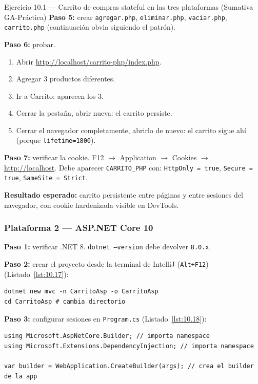 \begin{cajaejercicio}{Ejercicio 10.1 --- Carrito de compras stateful en las tres plataformas (Sumativa GA-Práctica)}
\textbf{Paso 5:} crear \texttt{agregar.php}, \texttt{eliminar.php},
\texttt{vaciar.php}, \texttt{carrito.php} (continuación obvia siguiendo
el patrón).

\textbf{Paso 6:} probar.
\begin{enumerate}
\item Abrir \url{http://localhost/carrito-php/index.php}.
\item Agregar 3 productos diferentes.
\item Ir a Carrito: aparecen los 3.
\item Cerrar la pestaña, abrir nueva: el carrito persiste.
\item Cerrar el navegador completamente, abrirlo de nuevo: el carrito
sigue ahí (porque \texttt{lifetime=1800}).
\end{enumerate}

\textbf{Paso 7:} verificar la cookie. F12 $\rightarrow$ Application
$\rightarrow$ Cookies $\rightarrow$ \url{http://localhost}. Debe
aparecer \texttt{CARRITO\_PHP} con: \texttt{HttpOnly = true},
\texttt{Secure = true}, \texttt{SameSite = Strict}.

\textbf{Resultado esperado:} carrito persistente entre páginas y entre
sesiones del navegador, con cookie hardenizada visible en DevTools.

\subsubsection*{Plataforma 2 --- ASP.NET Core 10}

\textbf{Paso 1:} verificar .NET 8. \texttt{dotnet --version} debe
devolver \texttt{8.0.x}.

\textbf{Paso 2:} crear el proyecto desde la terminal de IntelliJ
(\texttt{Alt+F12}) (Listado~\ref{lst:10.17}):
\begin{lstlisting}[style=shell,numbers=none,caption={Ejemplo de Shell},label=lst:10.17]
dotnet new mvc -n CarritoAsp -o CarritoAsp
cd CarritoAsp # cambia directorio
\end{lstlisting}

\textbf{Paso 3:} configurar sesiones en \texttt{Program.cs} (Listado~\ref{lst:10.18}):

\begin{lstlisting}[style=cs,caption={Program.cs},label=lst:10.18]
using Microsoft.AspNetCore.Builder; // importa namespace
using Microsoft.Extensions.DependencyInjection; // importa namespace

var builder = WebApplication.CreateBuilder(args); // crea el builder de la app


\end{lstlisting}
\end{cajaejercicio}
